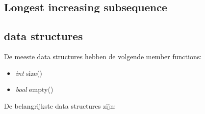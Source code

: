 \documentclass[10pt,a4paper,titlepage]{article}
\DeclareMathOperator{\bigO}{\mathcal{O}}
\begin{document}
\subsection{Longest increasing subsequence}


\iffalse
\subsection{data structures}
De meeste data structures hebben de volgende member functions:
\begin{itemize}[noitemsep,nolistsep]
	\item \textit{int} size() \bigO{c}
	\item \textit{bool} empty() \bigO{c}
\end{itemize}
De belangrijkste data structures zijn:
\end{document}
